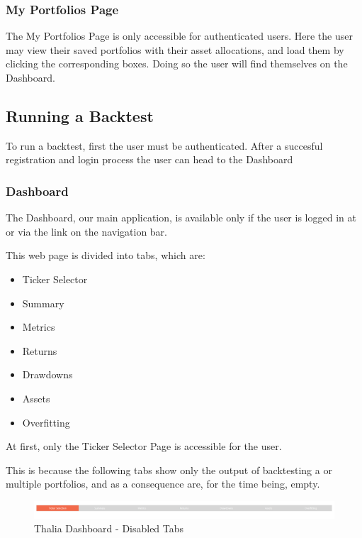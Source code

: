 \documentclass[main.tex]{subfiles}
\begin{document}
\subsubsection{My Portfolios Page}

The My Portfolios Page is only accessible for authenticated users. Here the user may view their saved portfolios with their asset allocations, and load them by clicking the corresponding boxes. Doing so the user will find themselves on the Dashboard. 

\subsection{Running a Backtest}

To run a backtest, first the user must be authenticated. After a succesful registration and login process the user can head to the Dashboard

\subsubsection{Dashboard}

The Dashboard, our main application, is available only if the user is logged in at  or via the link on the navigation bar.

This web page is divided into tabs, which are:

\begin{itemize}
    \item Ticker Selector
    \item Summary
    \item Metrics
    \item Returns 
    \item Drawdowns
    \item Assets
    \item Overfitting
\end{itemize}

At first, only the Ticker Selector Page is accessible for the user. 

This is because the following tabs show only the output of backtesting a or multiple portfolios, and as a consequence are, for the time being, empty.

\begin{figure}[H]

   \centering

   \includegraphics[width=\textwidth]{08Appendices/081User/081Pictures/disabled_tabs.png}

   \caption{Thalia Dashboard - Disabled Tabs}

   \label{thalia_disabled_tabs}

\end{figure}
\end{document}
